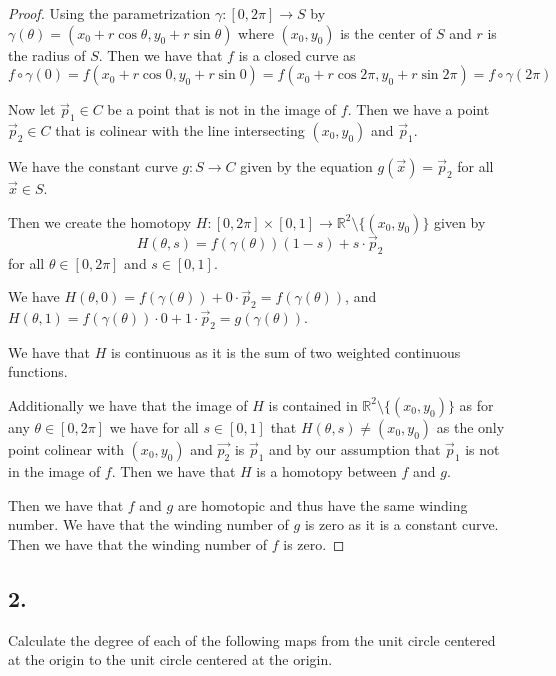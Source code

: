 \documentclass{amsart}
\theoremstyle{plain}
\theoremstyle{definition}
\theoremstyle{remark}
\begin{document}
\begin{proof}
    Using the parametrization $\gamma:[0,2\pi]\to S$ by $\gamma(\theta)=(x_0+r\cos \theta, y_0 +r\sin \theta )$ where $(x_0,y_0)$ is the center of $S$ and $r$ is the radius of $S$. Then we have that $f$ is a closed curve as $$f\circ \gamma(0)=f(x_0+r\cos 0, y_0 +r\sin 0)=f(x_0+r\cos 2\pi , y_0 +r\sin 2\pi)=f\circ \gamma(2\pi)$$
    
    Now let $\vec p_1\in C$ be a point that is not in the image of $f$. Then we have a point $\vec p_2\in C$ that is colinear with the line intersecting $(x_0,y_0)$ and $\vec p_1$. 

    We have the constant curve $g: S \to C$ given by the equation $g(\vec x) = \vec p_2$ for all $\vec x\in S$. 
    
    
    Then we create the homotopy $H:[0,2\pi]\times [0,1]\to \mathbb{R}^2\setminus \{(x_0,y_0)\}$ given by $$H(\theta,s)=f(\gamma (\theta))(1-s)+s\cdot \vec p_2$$ for all $\theta \in [0,2\pi]$ and $s\in [0,1]$. 

    We have $H(\theta,0)=f(\gamma (\theta))+0\cdot \vec p_2=f(\gamma(\theta))$, and $H(\theta,1)=f(\gamma(\theta ))\cdot 0 + 1\cdot \vec p_2=g(\gamma (\theta))$. 

    We have that $H$ is continuous as it is the sum of two weighted continuous functions. 
    
    Additionally we have that the image of $H$ is contained in $\mathbb{R}^2\setminus \{(x_0,y_0)\}$ as for any $\theta\in [0,2\pi]$ we have for all $s\in[0,1]$ that $H(\theta,s)\neq (x_0,y_0)$ as the only point colinear with  $(x_0,y_0)$ and $\vec{p_2}$ is $\vec p_1$ and by our assumption that $\vec p_1$ is not in the image of $f$. Then we have that $H$ is a homotopy between $f$ and $g$. 

    Then we have that $f$ and $g$ are homotopic and thus have the same winding number. We have that the winding number of $g$ is zero as it is a constant curve. Then we have that the winding number of $f$ is zero.


\end{proof}





\vspace{.15in}
\noindent
\subsection*{2.} Calculate the degree of each of the following maps from the unit circle centered at the origin to the unit circle centered at the origin. 
\end{document}

